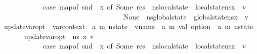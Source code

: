 \begin{isabellebody}
\ \ \ \ \ \ \ \ \ \ \ \ {\isacharparenleft}{\kern0pt}case\ {\isacharparenleft}{\kern0pt}map{\isacharunderscore}{\kern0pt}of\ {\isacharparenleft}{\kern0pt}snd\ {\isasymLambda}{\isacharparenright}{\kern0pt}\ x{\isacharparenright}{\kern0pt}\ of\ Some\ res\ {\isasymRightarrow}\ n{\isacharunderscore}{\kern0pt}s{\isasymlparr}local{\isacharunderscore}{\kern0pt}state\ {\isacharcolon}{\kern0pt}{\isacharequal}{\kern0pt}\ {\isacharparenleft}{\kern0pt}local{\isacharunderscore}{\kern0pt}state{\isacharparenleft}{\kern0pt}n{\isacharunderscore}{\kern0pt}s{\isacharparenright}{\kern0pt}{\isacharparenright}{\kern0pt}{\isacharparenleft}{\kern0pt}x\ {\isasymmapsto}\ v{\isacharparenright}{\kern0pt}\ {\isasymrparr}\ \ {\isacharbar}{\kern0pt}\isanewline
\ \ \ \ \ \ \ \ \ \ \ \ \ \ \ \ \ \ \ \ \ \ \ \ \ \ \ \ \ \ \ \ \ None\ {\isasymRightarrow}\ n{\isacharunderscore}{\kern0pt}s{\isasymlparr}global{\isacharunderscore}{\kern0pt}state\ {\isacharcolon}{\kern0pt}{\isacharequal}{\kern0pt}\ {\isacharparenleft}{\kern0pt}global{\isacharunderscore}{\kern0pt}state{\isacharparenleft}{\kern0pt}n{\isacharunderscore}{\kern0pt}s{\isacharparenright}{\kern0pt}{\isacharparenright}{\kern0pt}{\isacharparenleft}{\kern0pt}x\ {\isasymmapsto}\ v{\isacharparenright}{\kern0pt}\ {\isasymrparr}{\isacharparenright}{\kern0pt}{\isachardoublequoteclose}\isanewline
\isanewline
{}\isamarkupfalse%
\ update{\isacharunderscore}{\kern0pt}var{\isacharunderscore}{\kern0pt}opt\ {\isacharcolon}{\kern0pt}{\isacharcolon}{\kern0pt}\ {\isachardoublequoteopen}var{\isacharunderscore}{\kern0pt}context\ {\isasymRightarrow}\ {\isacharparenleft}{\kern0pt}{\isacharprime}{\kern0pt}a{\isacharcomma}{\kern0pt}\ {\isacharprime}{\kern0pt}m{\isacharparenright}{\kern0pt}\ nstate\ {\isasymRightarrow}\ vname\ {\isasymRightarrow}\ {\isacharparenleft}{\kern0pt}{\isacharprime}{\kern0pt}a{\isacharcomma}{\kern0pt}\ {\isacharprime}{\kern0pt}m{\isacharparenright}{\kern0pt}\ val\ option\ {\isasymRightarrow}\ {\isacharparenleft}{\kern0pt}{\isacharprime}{\kern0pt}a{\isacharcomma}{\kern0pt}\ {\isacharprime}{\kern0pt}m{\isacharparenright}{\kern0pt}\ nstate{\isachardoublequoteclose}\isanewline
\ \ \ \isanewline
\ \ \ {\isachardoublequoteopen}update{\isacharunderscore}{\kern0pt}var{\isacharunderscore}{\kern0pt}opt\ {\isasymLambda}\ n{\isacharunderscore}{\kern0pt}s\ x\ v\ {\isacharequal}{\kern0pt}\isanewline
\ \ \ \ \ \ \ \ \ \ \ \ {\isacharparenleft}{\kern0pt}case\ {\isacharparenleft}{\kern0pt}map{\isacharunderscore}{\kern0pt}of\ {\isacharparenleft}{\kern0pt}snd\ {\isasymLambda}{\isacharparenright}{\kern0pt}\ x{\isacharparenright}{\kern0pt}\ of\ Some\ res\ {\isasymRightarrow}\ n{\isacharunderscore}{\kern0pt}s{\isasymlparr}local{\isacharunderscore}{\kern0pt}state\ {\isacharcolon}{\kern0pt}{\isacharequal}{\kern0pt}\ {\isacharparenleft}{\kern0pt}local{\isacharunderscore}{\kern0pt}state{\isacharparenleft}{\kern0pt}n{\isacharunderscore}{\kern0pt}s{\isacharparenright}{\kern0pt}{\isacharparenright}{\kern0pt}{\isacharparenleft}{\kern0pt}x\ {\isacharcolon}{\kern0pt}{\isacharequal}{\kern0pt}\ v{\isacharparenright}{\kern0pt}{\isasymrparr}\ \ {\isacharbar}{\kern0pt}\isanewline

\end{isabellebody}
